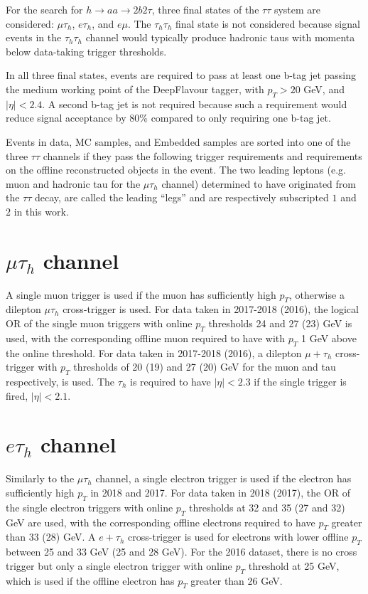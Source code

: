 For the search for $h \rightarrow aa \rightarrow 2b2\tau$, three final states of the $\tau\tau$ system are considered: $\mu\tau_{h}$, $e\tau_{h}$, and $e\mu$. The $\tau_{h}\tau_{h}$ final state is not considered because signal events in the $\tau_{h}\tau_{h}$ channel would typically produce hadronic taus with momenta below data-taking trigger thresholds.

In all three final states, events are required to pass at least one b-tag jet passing the medium working point of the DeepFlavour tagger, with $p_{T} > 20$ GeV, and $|\eta| < 2.4$. A second b-tag jet is not required because such a requirement would reduce signal acceptance by 80\% compared to only requiring one b-tag jet.

Events in data, MC samples, and Embedded samples are sorted into one of the three $\tau\tau$ channels if they pass the following trigger requirements and requirements on the offline reconstructed objects in the event. The two leading leptons (e.g. muon and hadronic tau for the $\mu\tau_{h}$ channel) determined to have originated from the $\tau\tau$ decay, are called the leading ``legs'' and are respectively subscripted $1$ and $2$ in this work.


\section{$\mu\tau_{h}$ channel}

A single muon trigger is used if the muon has sufficiently high $p_{T}$, otherwise a dilepton $\mu\tau_{h}$ cross-trigger is used. For data taken in 2017-2018 (2016), the logical OR of the single muon triggers with online $p_{T}$ thresholds 24 and 27 (23) GeV is used, with the corresponding offline muon required to have with $p_{T}$ 1 GeV above the online threshold. For data taken in 2017-2018 (2016), a dilepton $\mu + \tau_{h}$ cross-trigger with $p_{T}$ thresholds of 20 (19) and 27 (20) GeV for the muon and tau respectively, is used. The $\tau_{h}$ is required to have $|\eta| < 2.3$ if the single trigger is fired, $|\eta| < 2.1$. 

\section{$e\tau_{h}$ channel}

Similarly to the $\mu\tau_{h}$ channel, a single electron trigger is used if the electron has sufficiently high $p_{T}$ in 2018 and 2017. For data taken in 2018 (2017), the OR of the single electron triggers with online $p_{T}$ thresholds at 32 and 35 (27 and 32) GeV are used, with the corresponding offline electrons required to have $p_{T}$ greater than 33 (28) GeV. A $e + \tau_{h}$ cross-trigger is used for electrons with lower offline $p_{T}$ between 25 and 33 GeV (25 and 28 GeV). For the 2016 dataset, there is no cross trigger but only a single electron trigger with online $p_{T}$ threshold at 25 GeV, which is used if the offline electron has $p_{T}$ greater than 26 GeV.

